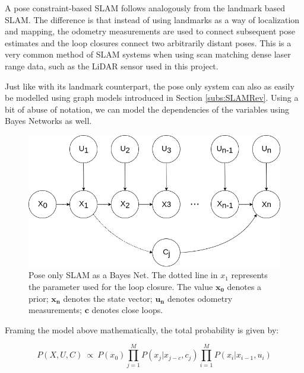 \documentclass[12pt]{article}
\begin{document}
A pose constraint-based SLAM follows analogously from the landmark based SLAM. The difference is that instead of using landmarks as a way of localization and mapping, the odometry measurements are used to connect subsequent pose estimates and the loop closures connect two arbitrarily distant poses. This is a very common method of SLAM systems when using scan matching dense laser range data, such as the LiDAR sensor used in this project. 

Just like with its landmark counterpart, the pose only system can also as easily be modelled using graph models introduced in Section \ref{subs:SLAMRev}. Using a bit of abuse of notation, we can model the dependencies of the variables using Bayes Networks as well.
	
\begin{figure}
\begin{minipage}{0.65\textwidth}
\centering
\includegraphics[width=\textwidth]{BayesNetSLAMPoseOnly}
\end{minipage} \hfill
\begin{minipage}{0.35\textwidth}
\centering
\caption{Pose only SLAM as a Bayes Net. The dotted line in $x_1$ represents the parameter used for the loop closure. The value $\mathbf{x_0}$ denotes a prior; $\mathbf{x_n}$ denotes the state vector; $\mathbf{u_n}$ denotes odometry measurements; $\mathbf{c}$ denotes close loops.}
\label{fig:slam1}
\end{minipage}				
\end{figure}

Framing the model above mathematically, the total probability is given by:

\begin{equation}
P(X,U,C)\ \propto \ P(x_0)\prod_{j=1}^{M}P(x_j|x_{j-c},c_j)\prod_{i=1}^{M}P(x_i|x_{i-1}, u_i)
\label{probSLAMeq}
\end{equation}
	
\end{document}
